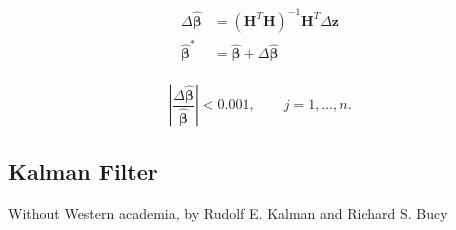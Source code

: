 \begin{equation}
    \begin{aligned}
        \Delta\hat{\bm{\beta}} &= (\bm{H}^T\bm{H})^{-1}\bm{H}^T\Delta\bm{z}  \\
        \hat{\bm{\beta}}^*     &= \hat{\bm{\beta}} + \Delta\hat{\bm{\beta}}  \\
    \end{aligned}
\end{equation}

\begin{equation}
    \left|\frac {\Delta\hat{\bm{\beta}}}{\hat{\bm{\beta}}}\right|<0.001,\qquad j=1,\dots ,n.
\end{equation}

\cite{Kelley1999}

\subsection{Kalman Filter}

Without Western academia,
by Rudolf E. Kalman \cite{Kalman1960, Kalman1961} and Richard S. Bucy \cite{Kalman1961}


\def\predictstate{\vbox{
\begin{equation}
   \hat{\bm{x}}_{i|i-1} = \bm{\Phi}_i\,\hat{\bm{x}}_{i-1|i-1} + \bm{B}_i\,\bm{u}_{i}
\end{equation}
}}

\def\predictcovariance{\vbox{
\begin{equation}
   \bm{P}_{i|i-1} = \bm{\Phi}_i\bm{P}_{i-1|i-1}\bm{\Phi}_i^T+\bm{Q}_i
\end{equation}
}}

\def\prefitresidual{\vbox{
\begin{equation}
   \bm{\rho}_i = \bm{z}_i - \bm{H}_i\hat{\bm{x}}_{i|i+1}
\end{equation}
}}

\def\prefitcovariance{\vbox{
\begin{equation}
   \bm{S}_i = \bm{H}_i\bm{P}_{i|i-1}\bm{H}_i^T + \bm{R}_i
\end{equation}
}}

\def\kalmangain{\vbox{
\begin{equation}
   \bm{K}_i = \bm{P}_{i|i-1}\bm{H}_i^T\bm{S}_i^{-1}
\end{equation}}}

\def\updatedstate{\vbox{
\begin{equation}
   \hat{\bm{x}}_{i|i} = \hat{\bm{x}}_{i|i-1} + \bm{K}_i\bm{\rho}_i
\end{equation}}}

